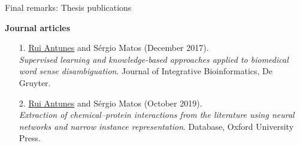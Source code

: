 \begin{frame}[t]{Final remarks: Thesis publications}

\vspace*{-3mm}

\newcommand{\minorscriptsize}{\fontsize{7.0pt}{8.4pt}\selectfont}

\textbf{\minorscriptsize Journal articles}


\fontsize{4.8pt}{5.76pt}\selectfont

\settowidth{\leftmargini}{7.}
\addtolength{\leftmargini}{\labelsep}


\begin{itemize}

\item[1.]
\underline{Rui Antunes} and Sérgio Matos (December 2017).\\
\textit{Supervised learning and knowledge-based approaches applied to biomedical word sense disambiguation}.
Journal of Integrative Bioinformatics, De Gruyter.

\item[2.]
\underline{Rui Antunes} and Sérgio Matos (October 2019).\\
\textit{Extraction of chemical--protein interactions from the literature using neural networks and narrow instance representation}.
Database, Oxford University Press.


\end{itemize}
\end{frame}
